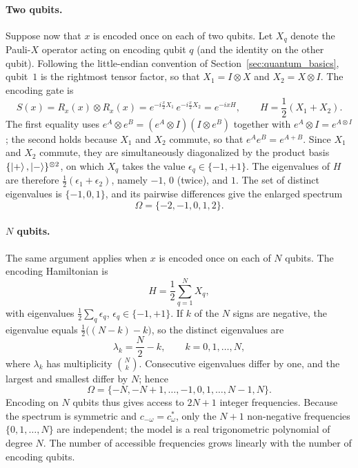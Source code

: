 \documentclass[12pt]{article}
\numberwithin{equation}{section}  %
\begin{document}
\paragraph{Two qubits.} Suppose now that $x$ is encoded once on each of two qubits. Let $X_q$ denote the Pauli-$X$ operator acting on encoding qubit $q$ (and the identity on the other qubit). Following the little-endian convention of Section~\ref{sec:quantum_basics}, qubit~$1$ is the rightmost tensor factor, so that $X_1 = I \otimes X$ and $X_2 = X \otimes I$. The encoding gate is
\begin{equation}
S(x) = R_x(x) \otimes R_x(x) = e^{-i\frac{x}{2}X_1}\, e^{-i\frac{x}{2}X_2} = e^{-ixH}, \qquad
H = \frac{1}{2}\left(X_1 + X_2\right).
\end{equation}
The first equality uses $e^{A} \otimes e^{B} = (e^{A} \otimes I)(I \otimes e^{B})$ together with $e^{A} \otimes I = e^{A \otimes I}$; the second holds because $X_1$ and $X_2$ commute, so that $e^{A}e^{B} = e^{A+B}$. Since $X_1$ and $X_2$ commute, they are simultaneously diagonalized by the product basis $\{\ket{+}, \ket{-}\}^{\otimes 2}$, on which $X_q$ takes the value $\epsilon_q \in \{-1, +1\}$. The eigenvalues of $H$ are therefore $\frac{1}{2}(\epsilon_1 + \epsilon_2)$, namely $-1$, $0$ (twice), and $1$. The set of distinct eigenvalues is $\{-1, 0, 1\}$, and its pairwise differences give the enlarged spectrum
\begin{equation}
\Omega = \{-2, -1, 0, 1, 2\}.
\end{equation}

\paragraph{$N$ qubits.} The same argument applies when $x$ is encoded once on each of $N$ qubits. The encoding Hamiltonian is
\begin{equation}
H = \frac{1}{2}\sum_{q=1}^{N} X_q,
\end{equation}
with eigenvalues $\frac{1}{2}\sum_{q} \epsilon_q$, $\epsilon_q \in \{-1, +1\}$. If $k$ of the $N$ signs are negative, the eigenvalue equals $\frac{1}{2}\big((N-k) - k\big)$, so the distinct eigenvalues are
\begin{equation}
\lambda_k = \frac{N}{2} - k, \qquad k = 0, 1, \ldots, N,
\end{equation}
where $\lambda_k$ has multiplicity $\binom{N}{k}$. Consecutive eigenvalues differ by one, and the largest and smallest differ by $N$; hence
\begin{equation}
\Omega = \{-N, -N+1, \ldots, -1, 0, 1, \ldots, N-1, N\}.
\label{eq:parallel_spectrum}
\end{equation}
Encoding on $N$ qubits thus gives access to $2N+1$ integer frequencies. Because the spectrum is symmetric and $c_{-\omega} = c_\omega^*$, only the $N+1$ non-negative frequencies $\{0, 1, \ldots, N\}$ are independent; the model is a real trigonometric polynomial of degree $N$. The number of accessible frequencies grows linearly with the number of encoding qubits.
\end{document}
